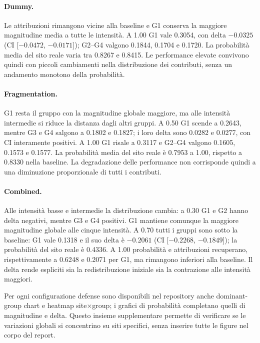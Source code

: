 \documentclass[11pt,a4paper]{article}
\begin{document}
\paragraph{Dummy.}
Le attribuzioni rimangono vicine alla baseline e G1 conserva la maggiore magnitudine media a tutte le intensità. A 1.00 G1 vale 0.3054, con delta $-0.0325$ (CI [$-0.0472$, $-0.0171$]); G2--G4 valgono 0.1844, 0.1704 e 0.1720. La probabilità media del sito reale varia tra 0.8267 e 0.8415. Le performance elevate convivono quindi con piccoli cambiamenti nella distribuzione dei contributi, senza un andamento monotono della probabilità.

\paragraph{Fragmentation.}
G1 resta il gruppo con la magnitudine globale maggiore, ma alle intensità intermedie si riduce la distanza dagli altri gruppi. A 0.50 G1 scende a 0.2643, mentre G3 e G4 salgono a 0.1802 e 0.1827; i loro delta sono 0.0282 e 0.0277, con CI interamente positivi. A 1.00 G1 risale a 0.3117 e G2--G4 valgono 0.1605, 0.1573 e 0.1577. La probabilità media del sito reale è 0.7953 a 1.00, rispetto a 0.8330 nella baseline. La degradazione delle performance non corrisponde quindi a una diminuzione proporzionale di tutti i contributi.

\paragraph{Combined.}
Alle intensità basse e intermedie la distribuzione cambia: a 0.30 G1 e G2 hanno delta negativi, mentre G3 e G4 positivi. G1 mantiene comunque la maggiore magnitudine globale alle cinque intensità. A 0.70 tutti i gruppi sono sotto la baseline: G1 vale 0.1318 e il suo delta è $-0.2061$ (CI [$-0.2268$, $-0.1849$]); la probabilità del sito reale è 0.4336. A 1.00 probabilità e attribuzioni recuperano, rispettivamente a 0.6248 e 0.2071 per G1, ma rimangono inferiori alla baseline. Il delta rende espliciti sia la redistribuzione iniziale sia la contrazione alle intensità maggiori.

Per ogni configurazione defense sono disponibili nel repository anche dominant-group chart e heatmap site$\times$group; i grafici di probabilità completano quelli di magnitudine e delta. Questo insieme supplementare permette di verificare se le variazioni globali si concentrino su siti specifici, senza inserire tutte le figure nel corpo del report.
\end{document}
